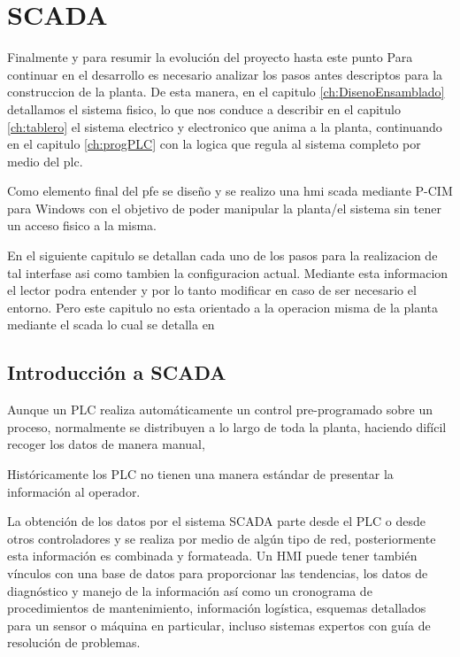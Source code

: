 \chapter{SCADA}
\label{ch:scada}

Finalmente y para resumir la evolución del proyecto hasta este punto
Para continuar en el desarrollo es necesario analizar los pasos antes descriptos para la construccion
de la planta. De esta manera, en el capitulo \ref{ch:DisenoEnsamblado} detallamos el sistema 
fisico, lo que nos conduce a describir en el capitulo \ref{ch:tablero} el sistema electrico y
electronico que anima a la planta, continuando en el capitulo \ref{ch:progPLC} con la logica
que regula al sistema completo por medio del \gls{plc}. 


Como elemento final del \gls{pfe} se diseño y se realizo una \gls{hmi} \gls{scada}
mediante P-CIM para Windows con el objetivo de poder manipular la planta/el sistema
sin tener un acceso fisico a la misma.

En el siguiente capitulo se detallan cada uno de los pasos para la realizacion de tal interfase
asi como tambien la configuracion actual. Mediante esta informacion el lector podra entender
y por lo tanto modificar en caso de ser necesario el entorno. Pero este capitulo no esta 
orientado a la operacion misma de la planta mediante el \gls{scada} lo cual se detalla en 

\section{Introducción a SCADA}
\label{sec:IntroScada}

Aunque un PLC realiza automáticamente un control pre-programado sobre un proceso, 
normalmente se distribuyen a lo largo de toda la planta, haciendo difícil recoger 
los datos de manera manual, 

Históricamente los PLC no tienen una manera estándar de presentar la información 
al operador. 

La obtención de los datos por el sistema SCADA parte desde el PLC o 
desde otros controladores y se realiza por medio de algún tipo de red, 
posteriormente esta información es combinada y formateada. Un HMI puede tener 
también vínculos con una base de datos para proporcionar las tendencias, los datos 
de diagnóstico y manejo de la información así como un cronograma de procedimientos 
de mantenimiento, información logística, esquemas detallados para un sensor o 
máquina en particular, incluso sistemas expertos con guía de resolución de 
problemas.


